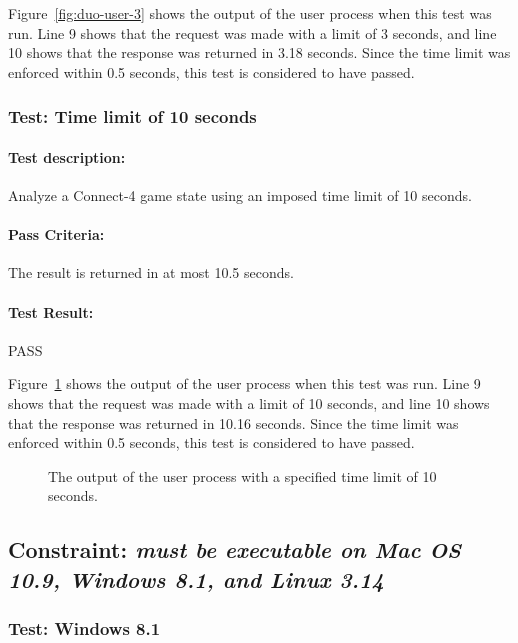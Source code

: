 \documentclass[pdftex,12pt,a4paper]{article}
\begin{document}
Figure~\ref{fig:duo-user-3} shows the output of the user process when this test was run. Line 9 shows that the request was made with a limit of 3 seconds, and line 10 shows that the response was returned in 3.18 seconds. Since the time limit was enforced within 0.5 seconds, this test is considered to have passed.

\subsubsection{\textbf{Test:} Time limit of 10 seconds}

\paragraph{Test description:} Analyze a Connect-4 game state using an imposed time limit of 10 seconds. 

\paragraph{Pass Criteria:} The result is returned in at most 10.5 seconds.

\paragraph{Test Result:} PASS

Figure~\ref{fig:user-10} shows the output of the user process when this test was run. Line 9 shows that the request was made with a limit of 10 seconds, and line 10 shows that the response was returned in 10.16 seconds. Since the time limit was enforced within 0.5 seconds, this test is considered to have passed.

\begin{figure}[h]

\caption{The output of the user process with a specified time limit of 10 seconds.}
\label{fig:user-10}
\end{figure}



\subsection{\textbf{Constraint:} \emph{must be executable on Mac OS 10.9, Windows 8.1, and Linux 3.14}}

\subsubsection{\textbf{Test:} Windows 8.1}
\end{document}
